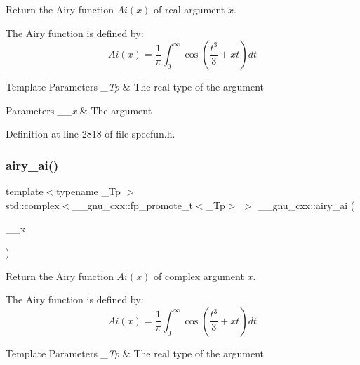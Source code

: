 Return the Airy function $ Ai(x) $ of real argument $ x $.

The Airy function is defined by\+: \[ Ai(x) = \frac{1}{\pi}\int_0^\infty \cos \left(\frac{t^3}{3} + xt \right)dt \]


\begin{DoxyTemplParams}{Template Parameters}
{\em \+\_\+\+Tp} & The real type of the argument \\
\hline
\end{DoxyTemplParams}

\begin{DoxyParams}{Parameters}
{\em \+\_\+\+\_\+x} & The argument \\
\hline
\end{DoxyParams}


Definition at line 2818 of file specfun.\+h.

\mbox{\label{group__gnu__math__spec__func_gacf37e6c9f186ade270b476c8e5826fb9}} 
\subsubsection{\texorpdfstring{airy\+\_\+ai()}{airy\_ai()}\hspace{0.1cm}{\footnotesize\ttfamily [2/2]}}
{\footnotesize\ttfamily template$<$typename \+\_\+\+Tp $>$ \\
std\+::complex$<$\+\_\+\+\_\+gnu\+\_\+cxx\+::fp\+\_\+promote\+\_\+t$<$\+\_\+\+Tp$>$ $>$ \+\_\+\+\_\+gnu\+\_\+cxx\+::airy\+\_\+ai (\begin{DoxyParamCaption}\item[{std\+::complex$<$ \+\_\+\+Tp $>$}]{\+\_\+\+\_\+x }\end{DoxyParamCaption})\hspace{0.3cm}{\ttfamily [inline]}}

Return the Airy function $ Ai(x) $ of complex argument $ x $.

The Airy function is defined by\+: \[ Ai(x) = \frac{1}{\pi}\int_0^\infty \cos \left(\frac{t^3}{3} + xt \right)dt \]


\begin{DoxyTemplParams}{Template Parameters}
{\em \+\_\+\+Tp} & The real type of the argument \\
\hline
\end{DoxyTemplParams}

